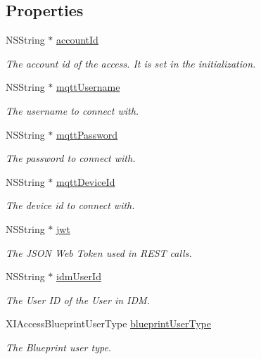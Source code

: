 \subsection*{Properties}
\begin{DoxyCompactItemize}
\item 
N\+S\+String $\ast$ \hyperlink{class_x_i_access_ab7c9c9e22935201b0a02672e7fc40493}{account\+Id}
\begin{DoxyCompactList}\small\item\em The account id of the access. It is set in the initialization. \end{DoxyCompactList}\item 
N\+S\+String $\ast$ \hyperlink{class_x_i_access_ab5ba2ba4a7e62564a4a2494a0b911bc5}{mqtt\+Username}
\begin{DoxyCompactList}\small\item\em The username to connect with. \end{DoxyCompactList}\item 
N\+S\+String $\ast$ \hyperlink{class_x_i_access_a04c660fd582a30ad70590859fa064ffe}{mqtt\+Password}
\begin{DoxyCompactList}\small\item\em The password to connect with. \end{DoxyCompactList}\item 
N\+S\+String $\ast$ \hyperlink{class_x_i_access_a74e77064908603354f861fd0d5fa5333}{mqtt\+Device\+Id}
\begin{DoxyCompactList}\small\item\em The device id to connect with. \end{DoxyCompactList}\item 
N\+S\+String $\ast$ \hyperlink{class_x_i_access_ab1f2a1242110ed0016d94554f912dcaf}{jwt}
\begin{DoxyCompactList}\small\item\em The J\+S\+ON Web Token used in R\+E\+ST calls. \end{DoxyCompactList}\item 
N\+S\+String $\ast$ \hyperlink{class_x_i_access_a2ac8d7b7c68d94c6388f6a221a9e56d8}{idm\+User\+Id}
\begin{DoxyCompactList}\small\item\em The User ID of the User in I\+DM. \end{DoxyCompactList}\item 
X\+I\+Access\+Blueprint\+User\+Type \hyperlink{class_x_i_access_a9d0a61df17a8b9420ae7ed102e94ff8a}{blueprint\+User\+Type}
\begin{DoxyCompactList}\small\item\em The Blueprint user type. \end{DoxyCompactList}\item 

\end{DoxyCompactItemize}
